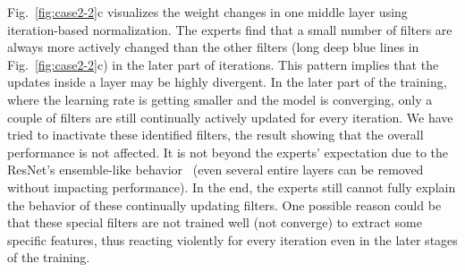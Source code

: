 \documentclass[format=acmsmall, review=false, screen=true]{acmart}
\newcommand{\dy}{\textcolor[rgb]{0,0,0}}
\begin{document}
Fig.~\ref{fig:case2-2}c visualizes the weight changes in one middle layer using iteration-based normalization.
The experts find that a small number of filters are always more actively changed than the other filters (long deep blue lines in Fig.~\ref{fig:case2-2}c) in the later part of iterations.
This pattern implies that the updates inside a layer may be highly divergent.
\dy{In the later part of the training, where the learning rate is getting smaller and the model is converging, only a couple of filters are still continually actively updated for every iteration. 
We have tried to inactivate these identified filters, the result showing that the overall performance is not affected.
It is not beyond the experts' expectation due to the ResNet's ensemble-like behavior~\cite{veit2016residual} (even several entire layers can be removed without impacting performance). In the end, the experts still cannot fully explain the behavior of these continually updating filters. One possible reason could be that these special filters are not trained well (not converge) to extract some specific features, thus reacting violently for every iteration even in the later stages of the training.}%
\end{document}
